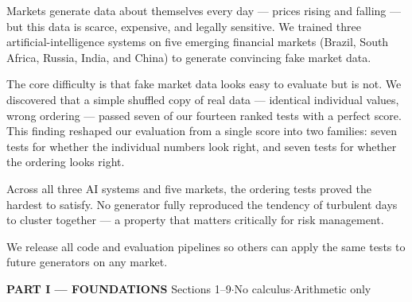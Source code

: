 \documentclass[10pt]{article}
\begin{document}
\begin{tcolorbox}[enhanced,arc=4pt,boxrule=1pt,colframe=Teal,colback=TealBg,
  top=6pt,bottom=6pt,left=8pt,right=8pt,before skip=4pt,after skip=8pt]
\small
Markets generate data about themselves every day --- prices rising and falling --- but this data is scarce, expensive, and legally sensitive.
We trained three artificial-intelligence systems on five emerging financial markets (Brazil, South Africa, Russia, India, and China) to generate convincing fake market data.

The core difficulty is that fake market data looks easy to evaluate but is not.
We discovered that a simple shuffled copy of real data --- identical individual values, wrong ordering --- passed seven of our fourteen ranked tests with a perfect score.
This finding reshaped our evaluation from a single score into two families: seven tests for whether the individual numbers look right, and seven tests for whether the ordering looks right.

Across all three AI systems and five markets, the ordering tests proved the hardest to satisfy.
No generator fully reproduced the tendency of turbulent days to cluster together --- a property that matters critically for risk management.

We release all code and evaluation pipelines so others can apply the same tests to future generators on any market.
\end{tcolorbox}

\vspace{4pt}
\begin{tcolorbox}[enhanced,arc=0pt,outer arc=0pt,boxrule=0pt,
  colback=Navy!10,colframe=Navy!10,top=3pt,bottom=3pt,left=8pt,right=8pt]
{\large\bfseries\color{Navy} PART I --- FOUNDATIONS}
\hfill{\small\color{Navy!70} Sections 1--9\quad$\cdot$\quad No calculus\quad$\cdot$\quad Arithmetic only}
\end{tcolorbox}
\end{document}
